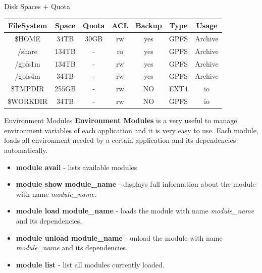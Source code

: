 \documentclass[final,t]{beamer}
\begin{document}
\begin{frame}[fragile]{}
\begin{columns}[t]
\begin{column}{.32\linewidth}
      \begin{block}{Disk Spaces + Quota}
        \vspace*{-2ex}
      \begin{center}
      \begin{tabular}{|c|c|c|c|c|c|c|}
      \hline 
      \textbf{FileSystem} & \textbf{Space} & \textbf{Quota} & \textbf{ACL} & \textbf{Backup} & \textbf{Type} & \textbf{Usage}  \\ 
      \hline 
      \$HOME & 34TB & 30GB & rw & yes & GPFS & Archive \\ 
      \hline 
      /share & 134TB & - & ro & yes & GPFS & Archive \\ 
      \hline 
      /gpfs1m & 134TB & - & rw & yes & GPFS & Archive \\ 
      \hline 
      /gpfs4m & 34TB & - & rw & yes & GPFS & Archive \\ 
      \hline 
      \$TMPDIR & 255GB & - & rw & NO & EXT4 & io \\ 
      \hline 
      \$WORKDIR & 34TB & - & rw & NO & GPFS & io \\ 
      \hline 
      \end{tabular} 
      \end{center}
        \vspace*{-2ex}
      \end{block}
 
 

      \begin{block}{Environment Modules}
      \textbf{Environment Modules} is a very useful to manage environment variables of each application and it is very easy to use. Each module, loads all environment needed by a certain application and its dependencies automatically.
        \begin{itemize}
        \item  \textbf{module avail} - lists available modules
        \item  \textbf{module show module\_name} - displays full information about the module with name \textit{module\_name}.
        \item  \textbf{module load module\_name} - loads the module with name \textit{module\_name} and its dependencies. 
        \item  \textbf{module unload module\_name } - unload  the module with name \textit{module\_name} and its dependencies. 
        \item  \textbf{module list} - list all modules currently loaded.
        \end{itemize}
      \end{block}
 


\end{column}
\end{columns}
\end{frame}
\end{document}
